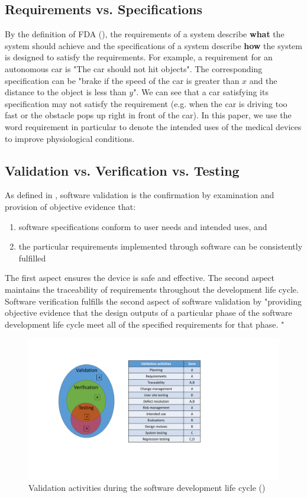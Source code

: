 \subsection{Requirements vs. Specifications}
By the definition of FDA (\cite{fda3}), the requirements of a system describe \textbf{what} the system should achieve and the specifications of a system describe \textbf{how} the system is designed to satisfy the requirements. For example, a requirement for an autonomous car is "The car should not hit objects". The corresponding specification can be "brake if the speed of the car is greater than $x$ and the distance to the object is less than $y$". We can see that a car satisfying its specification may not satisfy the requirement (e.g. when the car is driving too fast or the obstacle pops up right in front of the car). In this paper, we use the word requirement in particular to denote the intended uses of the medical devices to improve physiological conditions.

\subsection{Validation vs. Verification vs. Testing}
As defined in \cite{fda2}, software validation is the confirmation by examination and provision of objective evidence that:
\begin{enumerate}
	\item software specifications conform to user needs and intended uses, and 
	\item the particular requirements implemented through software can be consistently fulfilled
\end{enumerate}
The first aspect ensures the device is safe and effective. The second aspect maintains the traceability of requirements throughout the development life cycle.
Software verification fulfills the second aspect of software validation by "providing objective evidence that the design outputs of a particular phase of the software development life cycle meet all of the specified requirements for that phase. "
\begin{figure}[t]
		\centering
		\includegraphics[width=\textwidth]{figs/validation.pdf}
		\caption{Validation activities during the software development life cycle (\cite{Vogel})}
		\label{fig:validation}
\end{figure}

